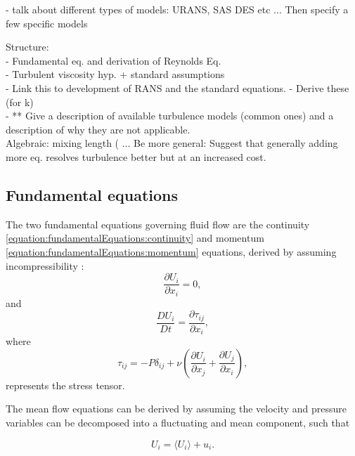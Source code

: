 \documentclass[12pt,oneside,a4paper]{article}
\newcommand{\pdev}[2]{\frac{\partial {#1}}{\partial {#2}}}
\newcommand{\Ddev}[2]{\frac{D {#1}}{D {#2}}}
\begin{document}
\vspace{2cm}

- talk about different types of models: URANS, SAS DES etc ... Then specify a few specific models 

\vspace{2cm}

Structure:\\
-	Fundamental eq. and derivation of Reynolds Eq.\\
-	Turbulent viscosity hyp. + standard assumptions\\
-	Link this to development of RANS and the standard equations. - Derive these (for k)\\
-	** Give a description of available turbulence models (common ones) and a description of why they are not applicable.\\
Algebraic: mixing length (
...
Be more general: Suggest that generally adding more eq. resolves turbulence better but at an increased cost. 

\subsection{Fundamental equations}
The two fundamental equations governing fluid flow are the continuity \eqref{equation:fundamentalEquations:continuity} and momentum \eqref{equation:fundamentalEquations:momentum} equations, derived by assuming incompressibility \citep{pope2001}:
\begin{equation}
\pdev{U_i}{x_i}=0,
\label{equation:fundamentalEquations:continuity}
\end{equation}
and
\begin{equation}
\Ddev{U_i}{t}
=
\pdev{\tau_{ij}}{x_i},
\label{equation:fundamentalEquations:momentum}
\end{equation}
where 
\begin{equation}
\tau_{ij}
=
-P\delta_{ij}
+
\nu\left( \pdev{U_i}{x_j}+\pdev{U_j}{x_i} \right),
\label{equation:fundamentalEquations:stressTensor}
\end{equation}
represents the stress tensor. 

The mean flow equations can be derived by assuming the velocity and pressure variables can be decomposed into a fluctuating and mean component, such that

\begin{equation}
U_i = \langle U_i \rangle + u_i.
\label{equation:fundamentalEquations:ReynoldsDecomposition}
\end{equation}
\end{document}
